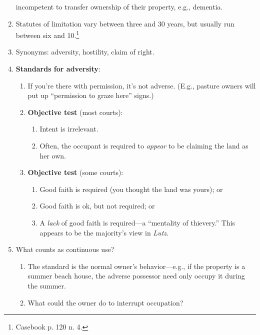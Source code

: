 \begin{enumerate}
    incompetent to transfer ownership of their property, e.g., dementia.
    \item Statutes of limitation vary between three and 30 years, but usually 
    run between six and 10.\footnote{Casebook p. 120 n. 4.}
    \item Synonyms: adversity, hostility, claim of right.
    \item \textbf{Standards for adversity}:
    \begin{enumerate}
        \item If you're there with permission, it's not adverse. (E.g., 
        pasture owners will put up ``permission to graze here'' signs.)
        \item \textbf{Objective test} (most courts):
        \begin{enumerate}
            \item Intent is irrelevant.
            \item Often, the occupant is required to \emph{appear} to be 
            claiming the land as her own.
        \end{enumerate}
        \item \textbf{Objective test} (some courts):
        \begin{enumerate}
            \item Good faith is required (you thought the land was yours); or
            \item Good faith is ok, but not required; or
            \item A \emph{lack} of good faith is required---a ``mentality of 
            thievery.'' This appears to be the majority's view in \emph{Lutz}.
        \end{enumerate}
    \end{enumerate}
    \item What counts as continuous use?
    \begin{enumerate}
        \item The standard is the normal owner's behavior---e.g., if the 
        property is a summer beach house, the adverse possessor need only 
        occupy it during the summer.
        \item What could the owner do to interrupt occupation?
        \begin{enumerate}

\end{enumerate}
\end{enumerate}
\end{enumerate}
